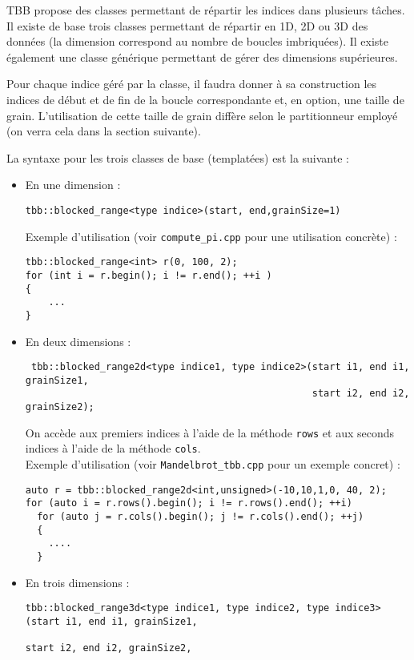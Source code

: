 \documentclass[11pt,a4paper]{article}
\begin{document}
TBB propose des classes permettant de répartir les indices dans plusieurs tâches.
Il existe de base trois classes permettant de répartir en 1D, 2D ou 3D des données 
(la dimension correspond au nombre de boucles imbriquées). Il existe également
une classe générique permettant de gérer des dimensions supérieures.

Pour chaque indice géré par la classe, il faudra donner à sa construction
les indices de début et de fin de la boucle correspondante et,
en option, une taille de grain. L'utilisation de cette taille de grain 
diffère selon le partitionneur employé (on verra cela dans la section suivante).

La syntaxe pour les trois classes de base (templatées) est la suivante :
\begin{itemize}
    \item En une dimension : 
    \begin{lstlisting}
tbb::blocked_range<type indice>(start, end,grainSize=1)
    \end{lstlisting}
    Exemple d'utilisation (voir \texttt{compute\_pi.cpp} pour une utilisation concrète) :
    \begin{lstlisting}
tbb::blocked_range<int> r(0, 100, 2);
for (int i = r.begin(); i != r.end(); ++i )
{
    ...
}
    \end{lstlisting}
    \item En deux dimensions :
    \begin{lstlisting}
 tbb::blocked_range2d<type indice1, type indice2>(start i1, end i1, grainSize1, 
                                                  start i2, end i2, grainSize2);
    \end{lstlisting}
    On accède aux premiers indices à l'aide de la méthode \texttt{rows}
    et aux seconds indices à l'aide de la méthode \texttt{cols}.\\
    Exemple d'utilisation (voir \texttt{Mandelbrot\_tbb.cpp} pour un exemple concret) :
    \begin{lstlisting}
auto r = tbb::blocked_range2d<int,unsigned>(-10,10,1,0, 40, 2);
for (auto i = r.rows().begin(); i != r.rows().end(); ++i)
  for (auto j = r.cols().begin(); j != r.cols().end(); ++j)
  {
    ....
  }
    \end{lstlisting}
    \item En trois dimensions :
    \begin{lstlisting}
tbb::blocked_range3d<type indice1, type indice2, type indice3>(start i1, end i1, grainSize1,
                                                               start i2, end i2, grainSize2,

\end{lstlisting}
\end{itemize}
\end{document}
